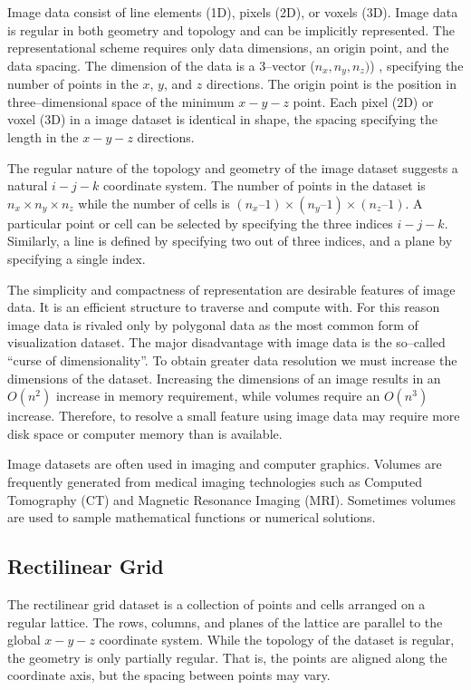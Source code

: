 Image data consist of line elements (1D), pixels (2D), or voxels (3D). Image data is regular in both geometry and topology and can be implicitly represented. The representational scheme requires only data dimensions, an origin point, and the data spacing. The dimension of the data is a 3--vector ($n_x,n_y,n_z)$) , specifying the number of points in the $x$, $y$, and $z$ directions. The origin point is the position in three--dimensional space of the minimum $x-y-z$ point. Each pixel (2D) or voxel (3D) in a image dataset is identical in shape, the spacing specifying the length in the $x-y-z$ directions.

The regular nature of the topology and geometry of the image dataset suggests a natural $i-j-k$ coordinate system. The number of points in the dataset is $n_x \times n_y \times n_z$ while the number of cells is $(n_x – 1) \times (n_y – 1) \times (n_z – 1)$. A particular point or cell can be selected by specifying the three indices $i-j-k$. Similarly, a line is defined by specifying two out of three indices, and a plane by specifying a single index.

The simplicity and compactness of representation are desirable features of image data. It is an efficient structure to traverse and compute with. For this reason image data is rivaled only by polygonal data as the most common form of visualization dataset. The major disadvantage with image data is the so--called ``curse of dimensionality''. To obtain greater data resolution we must increase the dimensions of the dataset. Increasing the dimensions of an image results in an $O(n^2)$ increase in memory requirement, while volumes require an $O(n^3)$ increase. Therefore, to resolve a small feature using image data may require more disk space or computer memory than is available.

Image datasets are often used in imaging and computer graphics. Volumes are frequently generated from medical imaging technologies such as Computed Tomography (CT) and Magnetic Resonance Imaging (MRI). Sometimes volumes are used to sample mathematical functions or numerical solutions.

\subsection{Rectilinear Grid}

The rectilinear grid dataset is a collection of points and cells arranged on a regular lattice. The rows, columns, and planes of the lattice are parallel to the global $x-y-z$ coordinate system. While the topology of the dataset is regular, the geometry is only partially regular. That is, the points are aligned along the coordinate axis, but the spacing between points may vary.

